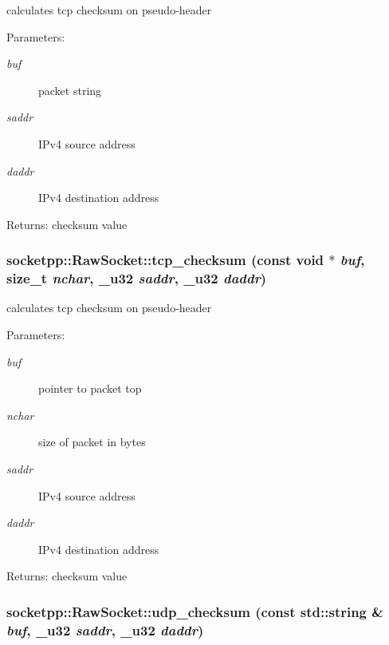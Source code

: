 calculates tcp checksum on pseudo-header 

\begin{Desc}
\item[Parameters:]
\begin{description}
\item[{\em buf}]packet string \item[{\em saddr}]IPv4 source address \item[{\em daddr}]IPv4 destination address \end{description}
\end{Desc}
\begin{Desc}
\item[Returns:]checksum value \end{Desc}
\hypertarget{classsocketpp_1_1RawSocket_bc807e5fcf41891e21faadd7b44b851a}{
\subsubsection[{tcp\_\-checksum}]{ socketpp::RawSocket::tcp\_\-checksum (const void $\ast$ {\em buf}, \/  size\_\-t {\em nchar}, \/  {\bf \_\-u32} {\em saddr}, \/  {\bf \_\-u32} {\em daddr})}}
\label{classsocketpp_1_1RawSocket_bc807e5fcf41891e21faadd7b44b851a}


calculates tcp checksum on pseudo-header 

\begin{Desc}
\item[Parameters:]
\begin{description}
\item[{\em buf}]pointer to packet top \item[{\em nchar}]size of packet in bytes \item[{\em saddr}]IPv4 source address \item[{\em daddr}]IPv4 destination address \end{description}
\end{Desc}
\begin{Desc}
\item[Returns:]checksum value \end{Desc}
\hypertarget{classsocketpp_1_1RawSocket_eb3d9cfc5e2893487d7e076ef56693d4}{
\subsubsection[{udp\_\-checksum}]{ socketpp::RawSocket::udp\_\-checksum (const std::string \& {\em buf}, \/  {\bf \_\-u32} {\em saddr}, \/  {\bf \_\-u32} {\em daddr})}}
\label{classsocketpp_1_1RawSocket_eb3d9cfc5e2893487d7e076ef56693d4}


